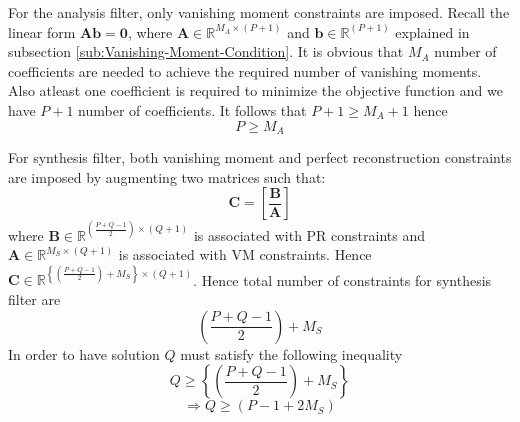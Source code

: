 For the analysis filter, only vanishing moment constraints are imposed. Recall the linear form $\mathbf{Ab=0}$, where $\mathbf{A}\in\mathbb{R}^{M_{A}\times(P+1)}$ and $ \mathbf{b}\in\mathbb{R}^{(P+1)}$ explained in subsection \ref{sub:Vanishing-Moment-Condition}. It is obvious that $M_A$ number of coefficients are needed to achieve the required number of vanishing moments. Also atleast one coefficient is required to minimize the objective function and we have $P+1$ number of coefficients. It follows that $P+1 \geq M_A + 1$  hence $$P \geq M_A$$

 For synthesis filter, both vanishing moment and perfect reconstruction constraints are imposed by augmenting two matrices such that: \[\mathbf{C}=\left[\mathbf{\frac{B}{A}}\right]\] where $\mathbf{B} \in {\mathbb{R}}^{\left(\frac{P+Q-1}{2}\right)\times(Q+1)}$ is associated with PR constraints and $\mathbf{A}\in\mathbb{R}^{{M_{S}}\times(Q+1)}$ is associated with VM constraints. Hence $\mathbf{C}\in\mathbb{R}^{\left\{\left(\frac{P+Q-1}{2}\right)+M_{S}\right\}\times(Q+1)}$. Hence total number of constraints for synthesis filter are $$\left(\frac{P+Q-1}{2}\right)+M_{S}$$ In order to have solution $Q$ must satisfy the following inequality $$ Q \geq \left\{\left(\frac{P+Q-1}{2}\right)+M_{S}\right\} $$ $$ \Rightarrow Q \geq(P-1+2M_S)$$